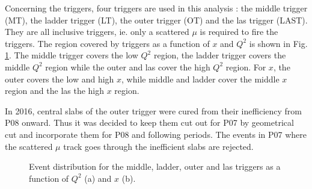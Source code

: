 Concerning the triggers, four triggers are used in this analysis : the middle trigger (MT), the ladder trigger (LT), the outer trigger (OT) and the las trigger (LAST). They are all inclusive triggers, ie. only a scattered $\mu$ is required to fire the triggers. The region covered by triggers as a function of $x$ and $Q^2$ is shown in Fig. \ref{pic:triggerxQ2}. The middle trigger covers the low $Q^2$ region, the ladder trigger covers the middle $Q^2$ region while the outer and las cover the high $Q^2$ region. For $x$, the outer covers the low and high $x$, while middle and ladder cover the middle $x$ region and the las the high $x$ region.

In 2016, central slabs of the outer trigger were cured from their inefficiency from P08 onward. Thus it was decided to keep them cut out for P07 by geometrical cut and incorporate them for P08 and following periods. The events in P07 where the scattered $\mu$ track goes through the inefficient slabs are rejected.

\begin{figure}[!h]
	\caption{Event distribution for the middle, ladder, outer and las triggers as a function of $Q^2$ (a) and $x$ (b).}
	\label{pic:triggerxQ2}
\end{figure}


